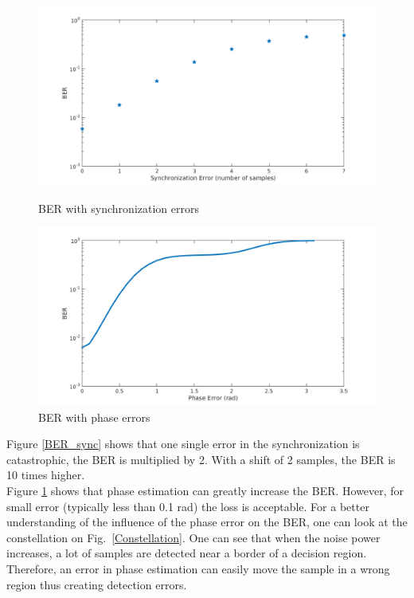 \documentclass[a4paper,12pt]{article}
\begin{document}
\begin{figure}[ht]
\begin{minipage}[c]{.45\linewidth}
\begin{center}
\includegraphics[scale=0.35]{BER_SyncError.png}
\caption{BER with synchronization errors}
\label{BER_sync}
\end{center}
\end{minipage}
\hfill
\begin{minipage}[c]{.45\linewidth}
\begin{center}
\includegraphics[scale=0.35]{BER_PhaseError.png}
\caption{BER with phase errors}
\label{BER_phase}
\end{center}
\end{minipage}
\end{figure}

Figure \ref{BER_sync} shows that one single error in the synchronization is catastrophic, the BER is multiplied by 2. With a shift of 2 samples, the BER is 10 times higher.\\

Figure \ref{BER_phase} shows that phase estimation can greatly increase the BER. However, for small error (typically less than 0.1 rad) the loss is acceptable. For a better understanding of the influence of the phase error on the BER, one can look at the constellation on Fig.~\ref{Constellation}. One can see that when the noise power increases, a lot of samples are detected near a border of a decision region. Therefore, an error in phase estimation can easily move the sample in a wrong region thus creating detection errors.
\end{document}
